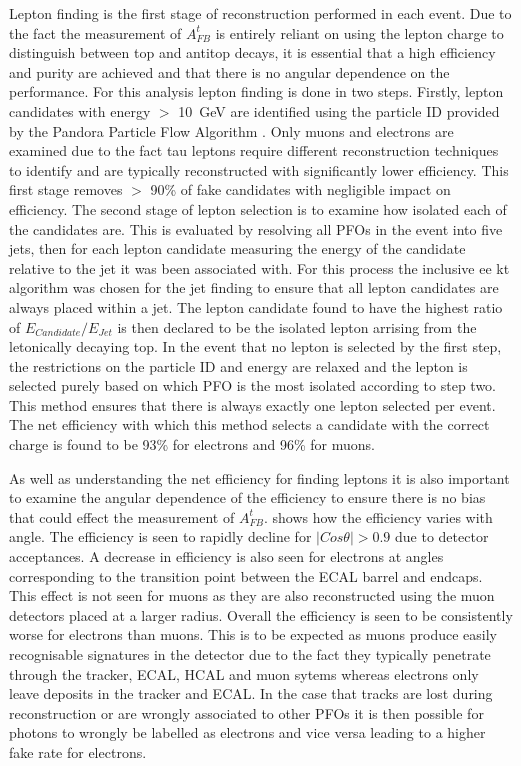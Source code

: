 Lepton finding is the first stage of reconstruction performed in each event. Due to the fact the measurement of $A_{FB}^{t}$ is entirely reliant on using the lepton charge to distinguish between top and antitop decays, it is essential that a high efficiency and purity are achieved and that there is no angular dependence on the performance. For this analysis lepton finding is done in two steps. Firstly, lepton candidates with energy $>$ 10~GeV are identified using the particle ID provided by the Pandora Particle Flow Algorithm \cite{Thomson200925}. Only muons and electrons are examined due to the fact tau leptons require different reconstruction techniques to identify and are typically reconstructed with significantly lower efficiency. This first stage removes $>$ 90\% of fake candidates with negligible impact on efficiency. The second stage of lepton selection is to examine how isolated each of the candidates are. This is evaluated by resolving all PFOs in the event into five jets, then for each lepton candidate measuring the energy of the candidate relative to the jet it was been associated with. For this process the inclusive ee kt algorithm was chosen for the jet finding to ensure that all lepton candidates are always placed within a jet. The lepton candidate found to have the highest ratio of $E_{Candidate}/E_{Jet}$ is then declared to be the isolated lepton arrising from the letonically decaying top. In the event that no lepton is selected by the first step, the restrictions on the particle ID and energy are relaxed and the lepton is selected purely based on which PFO is the most isolated according to step two. This method ensures that there is always exactly one lepton selected per event. The net efficiency with which this method selects a candidate with the correct charge is found to be 93\% for electrons and 96\% for muons.

As well as understanding the net efficiency for finding leptons it is also important to examine the angular dependence of the efficiency to ensure there is no bias that could effect the measurement of $A_{FB}^{t}$.  shows how the efficiency varies with angle. The efficiency is seen to rapidly decline for $|Cos\theta| > 0.9$ due to detector acceptances. A decrease in efficiency is also seen for electrons at angles corresponding to the transition point between the ECAL barrel and endcaps. This effect is not seen for muons as they are also reconstructed using the muon detectors placed at a larger radius. Overall the efficiency is seen to be consistently worse for electrons than muons. This is to be expected as muons produce easily recognisable signatures in the detector due to the fact they typically penetrate through the tracker, ECAL, HCAL and muon sytems whereas electrons only leave deposits in the tracker and ECAL. In the case that tracks are lost during reconstruction or are wrongly associated to other PFOs it is then possible for photons to wrongly be labelled as electrons and vice versa leading to a higher fake rate for electrons.

